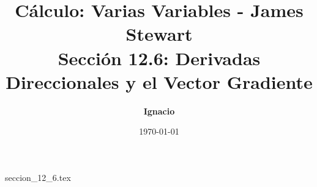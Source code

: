 \documentclass[11pt,spanish,oneside]{report}
\title{\textbf{Cálculo: Varias Variables - James Stewart} \\ \Large Sección 12.6: Derivadas Direccionales y el Vector Gradiente}
\author{\textbf{Ignacio}}
\date{\today}
\begin{document}
\maketitle

{seccion_12_6.tex}
\end{document}
